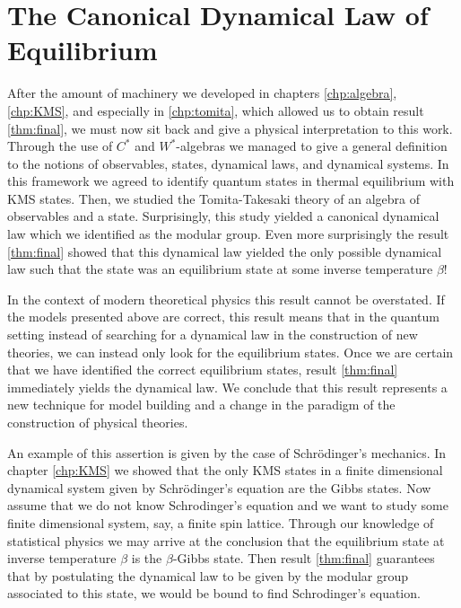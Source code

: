 \section{The Canonical Dynamical Law of Equilibrium}

After the amount of machinery we developed in chapters \ref{chp:algebra}, \ref{chp:KMS}, and especially in \ref{chp:tomita}, which allowed us to obtain result \ref{thm:final}, we must now sit back and give a physical interpretation to this work. Through the use of $C^*$ and $W^*$-algebras we managed to give a general definition to the notions of observables, states, dynamical laws, and dynamical systems. In this framework we agreed to identify quantum states in thermal equilibrium with KMS states. Then, we studied the Tomita-Takesaki theory of an algebra of observables and a state. Surprisingly, this study yielded a canonical dynamical law which we identified as the modular group. Even more surprisingly the result \ref{thm:final} showed that this dynamical law yielded the only possible dynamical law such that the state was an equilibrium state at some inverse temperature $\beta$!

In the context of modern theoretical physics this result cannot be overstated. If the models presented above are correct, this result means that in the quantum setting instead of searching for a dynamical law in the construction of new theories, we can instead only look for the equilibrium states. Once we are certain that we have identified the correct equilibrium states, result \ref{thm:final} immediately yields the dynamical law. We conclude that this result represents a new technique for model building and a change in the paradigm of the construction of physical theories.  

An example of this assertion is given by the case of Schrödinger's mechanics. In chapter \ref{chp:KMS} we showed that the only KMS states in a finite dimensional dynamical system given by Schrödinger's equation are the Gibbs states. Now assume that we do not know Schrodinger's equation and we want to study some finite  dimensional system, say, a finite spin lattice. Through our knowledge of statistical physics we may arrive at the conclusion that the equilibrium state at inverse temperature $\beta$ is the $\beta$-Gibbs state. Then result \ref{thm:final} guarantees that by postulating the dynamical law to be given by the modular group associated to this state, we would be bound to find Schrodinger's equation. 